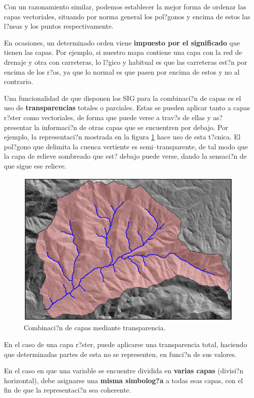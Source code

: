 Con un razonamiento similar, podemos establecer la mejor forma de ordenar las capas vectoriales, situando por norma general los pol?gonos y encima de estos las l?neas y los puntos respectivamente. 


En ocasiones, un determinado orden viene \textbf{impuesto por el significado} que tienen las capas. Por ejemplo, si nuestro mapa contiene una capa con la red de drenaje y otra con carreteras, lo l?gico y habitual es que las carreteras est?n por encima de los r?os, ya que lo normal es que pasen por encima de estos y no al contrario. 


Una funcionalidad de que disponen los SIG para la combinaci?n de capas es el uso de \textbf{transparencias} totales o parciales. Estas se pueden aplicar tanto a capas r?ster como vectoriales, de forma que puede verse a trav?s de ellas y as? presentar la informaci?n de otras capas que se encuentren por debajo. Por ejemplo, la representaci?n mostrada en la figura \ref{Fig:CombinacionCapas} hace uso de esta t?cnica. El pol?gono que delimita la cuenca vertiente es semi--transparente, de tal modo que la capa de relieve sombreado que est? debajo puede verse, dando la sensaci?n de que sigue ese relieve.

\begin{figure}[!hbt]
\centering
\includegraphics[width=.7\columnwidth]{../es/Visualizacion/CombinacionCapas.png}
\caption{\small Combinaci?n de capas mediante transparencia.}
\label{Fig:CombinacionCapas} 
\end{figure}

En el caso de una capa r?ster, puede aplicarse una transparencia total, haciendo que determinadas partes de esta no se representen, en funci?n de sus valores.

En el caso en que una variable se encuentre dividida en \textbf{varias capas} (divisi?n horizontal), debe asignarse una \textbf{misma simbolog?a} a todas esas capas, con el fin de que la representaci?n sea coherente.


